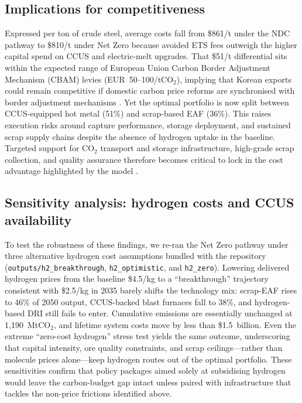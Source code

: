 \documentclass[preprint,1p,authoryear]{elsarticle}
\begin{document}
\subsection{Implications for competitiveness}

Expressed per ton of crude steel, average costs fall from \$861/t under the NDC pathway to \$810/t under Net Zero because avoided ETS fees outweigh the higher capital spend on CCUS and electric-melt upgrades. That \$51/t differential sits within the expected range of European Union Carbon Border Adjustment Mechanism (CBAM) levies (EUR~50--100/tCO$_2$), implying that Korean exports could remain competitive if domestic carbon price reforms are synchronised with border adjustment mechanisms \citep{Vogl2018}. Yet the optimal portfolio is now split between CCUS-equipped hot metal (51\%) and scrap-based EAF (36\%). This raises execution risks around capture performance, storage deployment, and sustained scrap supply chains despite the absence of hydrogen uptake in the baseline. Targeted support for CO$_2$ transport and storage infrastructure, high-grade scrap collection, and quality assurance therefore becomes critical to lock in the cost advantage highlighted by the model \citep{Griffin2020}.

\subsection{Sensitivity analysis: hydrogen costs and CCUS availability}

To test the robustness of these findings, we re-ran the Net Zero pathway under three alternative hydrogen cost assumptions bundled with the repository (\texttt{outputs/h2\_breakthrough}, \texttt{h2\_optimistic}, and \texttt{h2\_zero}). Lowering delivered hydrogen prices from the baseline \$4.5/kg to a ``breakthrough'' trajectory consistent with \$2.5/kg in 2035 barely shifts the technology mix: scrap-EAF rises to 46\% of 2050 output, CCUS-backed blast furnaces fall to 38\%, and hydrogen-based DRI still fails to enter. Cumulative emissions are essentially unchanged at 1{,}190~MtCO$_2$, and lifetime system costs move by less than \$1.5~billion. Even the extreme ``zero-cost hydrogen'' stress test yields the same outcome, underscoring that capital intensity, ore quality constraints, and scrap ceilings---rather than molecule prices alone---keep hydrogen routes out of the optimal portfolio. These sensitivities confirm that policy packages aimed solely at subsidising hydrogen would leave the carbon-budget gap intact unless paired with infrastructure that tackles the non-price frictions identified above.
\end{document}
